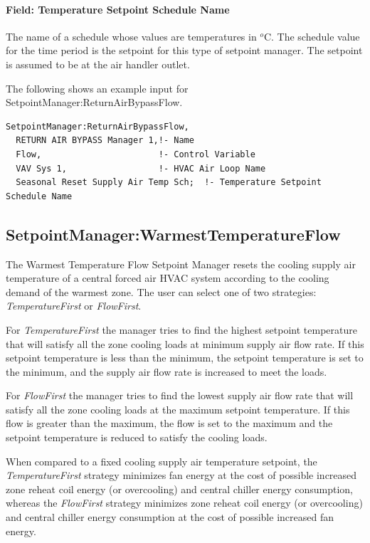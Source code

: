 \paragraph{Field: Temperature Setpoint Schedule Name}\label{field-temperature-setpoint-schedule-name}

The name of a schedule whose values are temperatures in \(^{o}\)C. The schedule value for the time period is the setpoint for this type of setpoint manager. The setpoint is assumed to be at the air handler outlet.

The following shows an example input for SetpointManager:ReturnAirBypassFlow.

\begin{lstlisting}
SetpointManager:ReturnAirBypassFlow,
  RETURN AIR BYPASS Manager 1,!- Name
  Flow,                       !- Control Variable
  VAV Sys 1,                  !- HVAC Air Loop Name
  Seasonal Reset Supply Air Temp Sch;  !- Temperature Setpoint Schedule Name
\end{lstlisting}

\subsection{SetpointManager:WarmestTemperatureFlow}\label{setpointmanagerwarmesttemperatureflow}

The Warmest Temperature Flow Setpoint Manager resets the cooling supply air temperature of a central forced air HVAC system according to the cooling demand of the warmest zone. The user can select one of two strategies: \emph{TemperatureFirst} or \emph{FlowFirst}.

For \emph{TemperatureFirst} the manager tries to find the highest setpoint temperature that will satisfy all the zone cooling loads at minimum supply air flow rate. If this setpoint temperature is less than the minimum, the setpoint temperature is set to the minimum, and the supply air flow rate is increased to meet the loads.

For \emph{FlowFirst} the manager tries to find the lowest supply air flow rate that will satisfy all the zone cooling loads at the maximum setpoint temperature. If this flow is greater than the maximum, the flow is set to the maximum and the setpoint temperature is reduced to satisfy the cooling loads.

When compared to a fixed cooling supply air temperature setpoint, the \emph{TemperatureFirst} strategy minimizes fan energy at the cost of possible increased zone reheat coil energy (or overcooling) and central chiller energy consumption, whereas the \emph{FlowFirst} strategy minimizes zone reheat coil energy (or overcooling) and central chiller energy consumption at the cost of possible increased fan energy.

